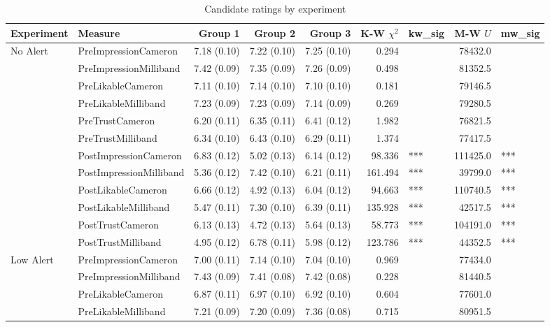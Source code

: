 \begin{table}[ht]
\centering
\caption{Candidate ratings by experiment} 
\begin{tabular}{llrrrrlrl}
  \hline
Experiment & Measure & Group 1 & Group 2 & Group 3 & K-W $\chi^2$ & kw_sig & M-W $U$ & mw_sig \\ 
  \hline
No Alert & PreImpressionCameron & 7.18 (0.10) & 7.22 (0.10) & 7.25 (0.10) & 0.294 &   & 78432.0 &   \\ 
   & PreImpressionMilliband & 7.42 (0.09) & 7.35 (0.09) & 7.26 (0.09) & 0.498 &   & 81352.5 &   \\ 
   & PreLikableCameron & 7.11 (0.10) & 7.14 (0.10) & 7.10 (0.10) & 0.181 &   & 79146.5 &   \\ 
   & PreLikableMilliband & 7.23 (0.09) & 7.23 (0.09) & 7.14 (0.09) & 0.269 &   & 79280.5 &   \\ 
   & PreTrustCameron & 6.20 (0.11) & 6.35 (0.11) & 6.41 (0.12) & 1.982 &   & 76821.5 &   \\ 
   & PreTrustMilliband & 6.34 (0.10) & 6.43 (0.10) & 6.29 (0.11) & 1.374 &   & 77417.5 &   \\ 
   & PostImpressionCameron & 6.83 (0.12) & 5.02 (0.13) & 6.14 (0.12) & 98.336 & *** & 111425.0 & *** \\ 
   & PostImpressionMilliband & 5.36 (0.12) & 7.42 (0.10) & 6.21 (0.11) & 161.494 & *** & 39799.0 & *** \\ 
   & PostLikableCameron & 6.66 (0.12) & 4.92 (0.13) & 6.04 (0.12) & 94.663 & *** & 110740.5 & *** \\ 
   & PostLikableMilliband & 5.47 (0.11) & 7.30 (0.10) & 6.39 (0.11) & 135.928 & *** & 42517.5 & *** \\ 
   & PostTrustCameron & 6.13 (0.13) & 4.72 (0.13) & 5.64 (0.13) & 58.773 & *** & 104191.0 & *** \\ 
   & PostTrustMilliband & 4.95 (0.12) & 6.78 (0.11) & 5.98 (0.12) & 123.786 & *** & 44352.5 & *** \\ 
  Low Alert & PreImpressionCameron & 7.00 (0.11) & 7.14 (0.10) & 7.04 (0.10) & 0.969 &   & 77434.0 &   \\ 
   & PreImpressionMilliband & 7.43 (0.09) & 7.41 (0.08) & 7.42 (0.08) & 0.228 &   & 81440.5 &   \\ 
   & PreLikableCameron & 6.87 (0.11) & 6.97 (0.10) & 6.92 (0.10) & 0.604 &   & 77601.0 &   \\ 
   & PreLikableMilliband & 7.21 (0.09) & 7.20 (0.09) & 7.36 (0.08) & 0.715 &   & 80951.5 &   \\ 

\end{tabular}
\end{table}
